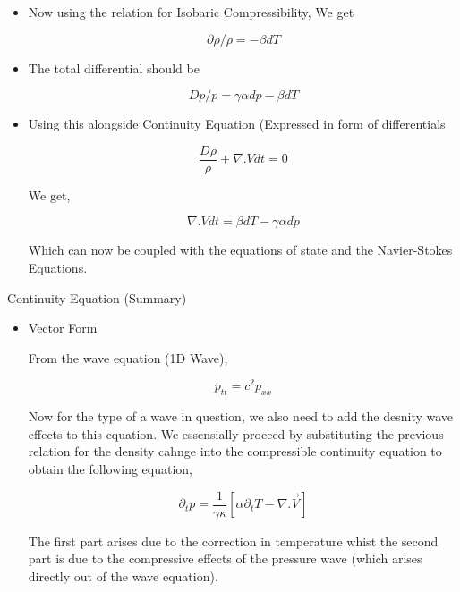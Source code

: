 \documentclass{beamer}
\begin{document}
\begin{frame}
\begin{itemize}

	\item{Now using the relation for Isobaric Compressibility, We get}
	
	\begin{equation}\partial \rho/\rho = -\beta dT\end{equation} 
	
	\item{The total differential should be}
	
	\begin{equation}Dp/p = \gamma \alpha dp - \beta dT\end{equation}
	
	\item{Using this alongside Continuity Equation (Expressed in form of differentials}
	
	\begin{equation}\frac{D\rho}{\rho} + \nabla . V dt = 0\end{equation}
	
	We get,
	
	\begin{equation}\nabla . V dt = \beta dT - \gamma \alpha dp\end{equation}
	
	Which can now be coupled with the equations of state and the Navier-Stokes Equations.

\end{itemize}
\end{frame}


\begin{frame}{Continuity Equation (Summary)}

\begin{itemize}
	\item Vector Form
	
	From the wave equation (1D Wave),
		
	\begin{equation}p_{tt} = c^2 p_{xx}\end{equation}

	Now for the type of a wave in question, we also need to add the desnity wave effects to this equation. We essensially proceed by substituting the previous relation for the density cahnge into the compressible continuity equation to obtain the following equation,
	
	\begin{equation}
	\partial_t p = \frac{1}{\gamma \kappa} [\alpha \partial_t T - \nabla . \vec{V}]
	\end{equation}
		
	The first part arises due to the correction in temperature whist the second part is due to the compressive effects of the pressure wave (which arises directly out of the wave equation).
	
	
\end{itemize}
\end{frame}
\end{document}
